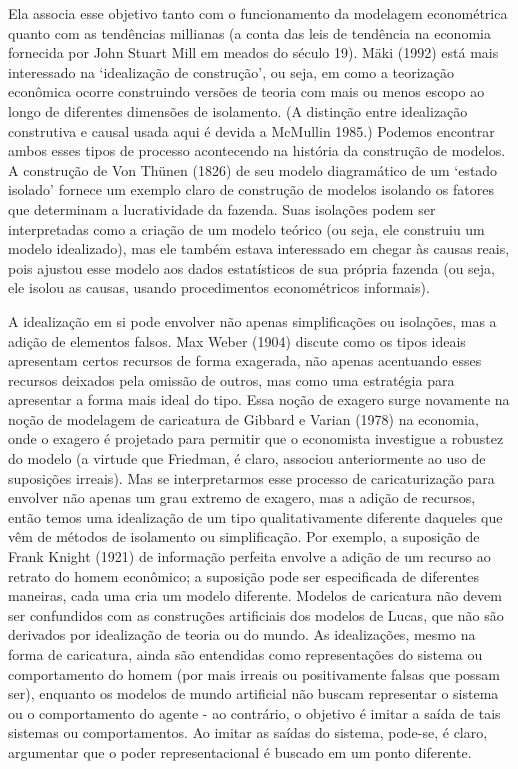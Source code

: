 \documentclass[a4paper,12pt]{article}[abntex2]
\begin{document}
Ela associa esse objetivo tanto com o funcionamento da modelagem econométrica quanto com as tendências millianas (a conta das leis de tendência na economia fornecida por John Stuart Mill em meados do século 19). Mäki (1992) está mais interessado na ‘idealização de construção’, ou seja, em como a teorização econômica ocorre construindo versões de teoria com mais ou menos escopo ao longo de diferentes dimensões de isolamento. (A distinção entre idealização construtiva e causal usada aqui é devida a McMullin 1985.) Podemos encontrar ambos esses tipos de processo acontecendo na história da construção de modelos. A construção de Von Thünen (1826) de seu modelo diagramático de um ‘estado isolado’ fornece um exemplo claro de construção de modelos isolando os fatores que determinam a lucratividade da fazenda. Suas isolações podem ser interpretadas como a criação de um modelo teórico (ou seja, ele construiu um modelo idealizado), mas ele também estava interessado em chegar às causas reais, pois ajustou esse modelo aos dados estatísticos de sua própria fazenda (ou seja, ele isolou as causas, usando procedimentos econométricos informais).

A idealização em si pode envolver não apenas simplificações ou isolações, mas a adição de elementos falsos. Max Weber (1904) discute como os tipos ideais apresentam certos recursos de forma exagerada, não apenas acentuando esses recursos deixados pela omissão de outros, mas como uma estratégia para apresentar a forma mais ideal do tipo. Essa noção de exagero surge novamente na noção de modelagem de caricatura de Gibbard e Varian (1978) na economia, onde o exagero é projetado para permitir que o economista investigue a robustez do modelo (a virtude que Friedman, é claro, associou anteriormente ao uso de suposições irreais). Mas se interpretarmos esse processo de caricaturização para envolver não apenas um grau extremo de exagero, mas a adição de recursos, então temos uma idealização de um tipo qualitativamente diferente daqueles que vêm de métodos de isolamento ou simplificação. Por exemplo, a suposição de Frank Knight (1921) de informação perfeita envolve a adição de um recurso ao retrato do homem econômico; a suposição pode ser especificada de diferentes maneiras, cada uma cria um modelo diferente. Modelos de caricatura não devem ser confundidos com as construções artificiais dos modelos de Lucas, que não são derivados por idealização de teoria ou do mundo. As idealizações, mesmo na forma de caricatura, ainda são entendidas como representações do sistema ou comportamento do homem (por mais irreais ou positivamente falsas que possam ser), enquanto os modelos de mundo artificial não buscam representar o sistema ou o comportamento do agente - ao contrário, o objetivo é imitar a saída de tais sistemas ou comportamentos. Ao imitar as saídas do sistema, pode-se, é claro, argumentar que o poder representacional é buscado em um ponto diferente.
\end{document}
